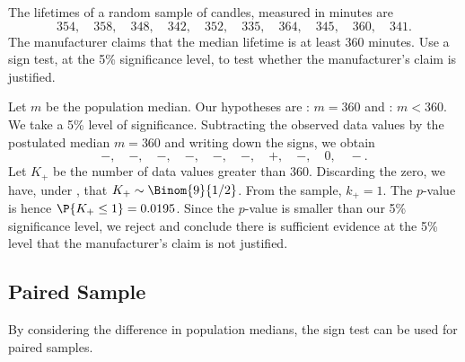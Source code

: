 \begin{sample}
    The lifetimes of a random sample of candles, measured in minutes are \[354, \quad 358, \quad 348, \quad 342, \quad 352, \quad 335, \quad 364, \quad 345, \quad 360, \quad 341.\] The manufacturer claims that the median lifetime is at least 360 minutes. Use a sign test, at the 5\% significance level, to test whether the manufacturer's claim is justified.
\end{sample}
\begin{sampans}
    Let $m$ be the population median. Our hypotheses are \nullhyp: $m = 360$ and \althyp: $m < 360$. We take a 5\% level of significance. Subtracting the observed data values by the postulated median $m = 360$ and writing down the signs, we obtain \[-, \quad -, \quad -, \quad -, \quad -, \quad -, \quad +, \quad -, \quad 0, \quad -.\] Let $K_+$ be the number of data values greater than 360. Discarding the zero, we have, under \nullhyp, that $K_+ \sim \Binom{9}{1/2}$. From the sample, $k_+ = 1$. The $p$-value is hence $\P{K_+ \leq 1} = 0.0195$. Since the $p$-value is smaller than our 5\% significance level, we reject \nullhyp{} and conclude there is sufficient evidence at the 5\% level that the manufacturer's claim is not justified.
\end{sampans}

\subsection{Paired Sample}

By considering the difference in population medians, the sign test can be used for paired samples.

